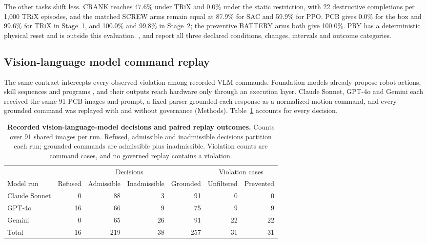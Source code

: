 \documentclass[12pt]{article}
\newcommand{\vlmrules}{\cmidrule(lr){2-5}\cmidrule(l){6-7}}
\begin{document}
The other tasks shift less. CRANK reaches 47.6\% under TRiX and 0.0\% under the
static restriction, with 22 destructive completions per 1,000 TRiX episodes,
and the matched SCREW arms remain equal at 87.9\% for SAC and 59.9\% for PPO.
PCB gives 0.0\% for the box and 99.6\% for TRiX in Stage~1, and 100.0\% and
99.8\% in Stage~2; the preventive BATTERY arms both give 100.0\%. PRY has a
deterministic physical reset and is outside this evaluation.
,  and  report
all three declared conditions, changes, intervals and outcome categories.

\subsection{Vision-language model command replay}
\label{sec:vlm-results}
The same contract intercepts every observed violation among recorded VLM
commands. Foundation models already propose robot actions, skill sequences and
programs \cite{ref9,ref10,ref11}, and their outputs reach hardware only through
an execution layer. Claude Sonnet, GPT-4o and Gemini each received the same
91 PCB images and prompt, a fixed parser grounded each response as a normalized
motion command, and every grounded command was replayed with and without
governance (Methods). Table~\ref{tab:vlm-results} accounts for every decision.

\begin{table}[!tbp]
\centering\small
\caption{\textbf{Recorded vision-language-model decisions and paired replay
outcomes.} Counts over 91 shared images per run. Refused, admissible and
inadmissible decisions partition each run; grounded commands are admissible
plus inadmissible. Violation counts are command cases, and no governed replay
contains a violation.}
\label{tab:vlm-results}
\setlength{\tabcolsep}{5pt}
\begin{tabular}{@{}lrrrrrr@{}}
\toprule
 & \multicolumn{4}{c}{Decisions} & \multicolumn{2}{c}{Violation cases}\\
\vlmrules
Model run & Refused & Admissible & Inadmissible & Grounded & Unfiltered & Prevented\\
\midrule
Claude Sonnet & 0  & 88 & 3  & 91 & 0  & 0\\
GPT-4o        & 16 & 66 & 9  & 75 & 9  & 9\\
Gemini        & 0  & 65 & 26 & 91 & 22 & 22\\
\midrule
Total         & 16 & 219 & 38 & 257 & 31 & 31\\
\bottomrule
\end{tabular}
\end{table}
\end{document}
